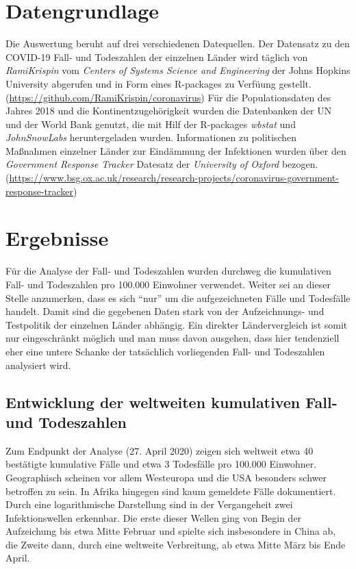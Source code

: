 \documentclass[12pt, a4paper]{article}
\begin{document}
\section{Datengrundlage}
Die Auswertung beruht auf drei verschiedenen Datequellen. Der Datensatz zu den COVID-19 Fall- und Todeszahlen der einzelnen Länder wird täglich von \emph{RamiKrispin} vom \emph{Centers of Systems Science and Engineering} der Johns Hopkins University abgerufen und in Form eines R-packages zu Verfüung gestellt. (\url{https://github.com/RamiKrispin/coronavirus}) Für die Populationsdaten des Jahres 2018 und die Kontinentzugehörigkeit wurden die Datenbanken der UN und der World Bank genutzt, die mit Hilf der R-packages \emph{wbstat} und \emph{JohnSnowLabs} heruntergeladen wurden.
Informationen zu politischen Maßnahmen einzelner Länder zur Eindämmung der Infektionen wurden über den \emph{Government Response Tracker} Datesatz der \emph{University of Oxford} bezogen. (\url{https://www.bsg.ox.ac.uk/research/research-projects/coronavirus-government-response-tracker})

\section{Ergebnisse}
Für die Analyse der Fall- und Todeszahlen wurden durchweg die kumulativen Fall- und Todeszahlen pro 100.000 Einwohner verwendet. Weiter sei an dieser Stelle anzumerken, dass es sich ``nur'' um die aufgezeichneten Fälle und Todesfälle handelt. Damit sind die gegebenen Daten stark von der Aufzeichnungs- und Testpolitik der einzelnen Länder abhängig. Ein direkter Ländervergleich ist somit nur eingeschränkt möglich und man muss davon ausgehen, dass hier tendenziell eher eine untere Schanke der tatsächlich vorliegenden Fall- und Todeszahlen analysiert wird. 
\subsection{Entwicklung der weltweiten kumulativen Fall- und Todeszahlen}
Zum Endpunkt der Analyse (27. April 2020) zeigen sich weltweit etwa 40 bestätigte kumulative Fälle und etwa 3 Todesfälle pro 100.000 Einwohner. Geographisch scheinen vor allem Westeuropa und die USA besonders schwer betroffen zu sein. In Afrika hingegen sind kaum gemeldete Fälle dokumentiert. Durch eine logarithmische Darstellung sind in der Vergangeheit zwei Infektionswellen erkennbar. Die erste dieser Wellen ging von Begin der Aufzeichung bis etwa Mitte Februar und spielte sich insbesondere in China ab, die Zweite dann, durch eine weltweite Verbreitung, ab etwa Mitte März bis Ende April.
\end{document}
